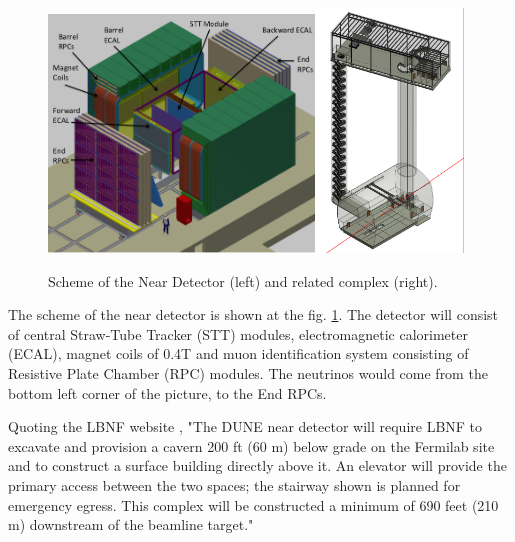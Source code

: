 \begin{figure}
\caption{Scheme of the Near Detector (left) and related complex (right).}
\label{fig:nearDetector}
\centering
\includegraphics[width=0.63\textwidth, keepaspectratio=true]{figs/nearDetector.png}\includegraphics[width=0.35\textwidth, keepaspectratio=true]{figs/nearDetector_project.png}
\end{figure}

The scheme of the near detector is shown at the fig. \ref{fig:nearDetector}. The detector will consist of central Straw-Tube Tracker (STT) modules, electromagnetic calorimeter (ECAL), magnet coils of 0.4T and muon identification system consisting of Resistive Plate Chamber (RPC) modules. The neutrinos would come from the bottom left corner of the picture, to the End RPCs.

Quoting the LBNF website \cite{ref_LBNFweb}, "The DUNE near detector will require LBNF to excavate and provision a cavern 200 ft (60 m) below grade on the Fermilab site and to construct a surface building directly above it. An elevator will provide the primary access between the two spaces; the stairway shown is planned for emergency egress. This complex will be constructed a minimum of 690 feet (210 m) downstream of the beamline target."

